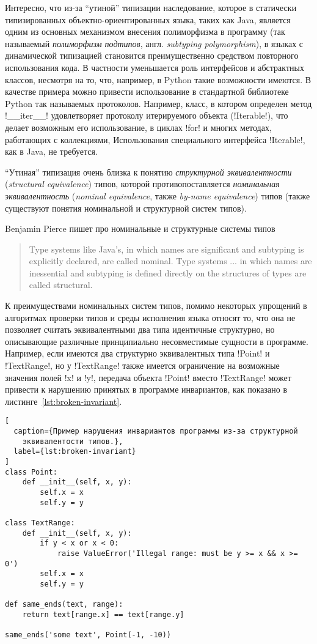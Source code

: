 Интересно, что из-за ``утиной'' типизации наследование, которое в статически
типизированных объектно-ориентированных языка, таких как Java, является
одним из основных механизмом внесения полиморфизма в программу (так называемый
\emph{полиморфизм подтипов}, англ. \emph{subtyping polymorphism}),
в языках с динамической типизацией становится преимущественно средством
повторного использования кода. В частности уменьшается роль интерфейсов и
абстрактных классов, несмотря на то, что, например, в Python такие возможности
имеются. В качестве примера можно привести использование в
стандартной библиотеке Python так называемых протоколов. Например, класс, в
котором определен метод !__iter__! удовлетворяет протоколу
итерируемого объекта (!Iterable!), что делает возможным его использование,
в циклах !for! и многих методах, работающих с коллекциями, 
Использования специального интерфейса !Iterable!, как в Java, не требуется.

``Утиная'' типизация очень близка к понятию \emph{структурной эквивалентности}
(\emph{structural equivalence}) типов, которой противопоставляется
\emph{номинальная эквивалентность} (\emph{nominal equivalence}, также
\emph{by-name equivalence}) типов (также существуют понятия номинальной и
структурной систем типов).

Benjamin Pierce пишет про номинальные и структурные системы
типов~\cite{Pierce2002}

\begin{quote}
Type systems like Java’s, in which names are significant and subtyping is
explicitly declared, are called nominal. Type systems ... in which names are
inessential and subtyping is defined directly on the structures of types are
called structural.
\end{quote}

К преимуществами номинальных систем типов, помимо некоторых упрощений в
алгоритмах проверки типов и среды исполнения языка относят то,
что она не позволяет считать эквивалентными два типа идентичные структурно, но
описывающие различные принципиально несовместимые сущности в программе.
Например, если имеются два структурно эквивалентных типа !Point! и
!TextRange!, но у !TextRange! также имеется ограничение на
возможные значения полей !x! и !y!, передача объекта !Point! вместо
!TextRange! может привести к нарушению принятых в программе инвариантов, как
показано в листинге~\ref{lst:broken-invariant}.

\begin{lstlisting}[
  caption={Пример нарушения инвариантов программы из-за структурной
    эквивалентости типов.},
  label={lst:broken-invariant}
]
class Point:
    def __init__(self, x, y):
        self.x = x
        self.y = y

class TextRange:
    def __init__(self, x, y):
        if y < x or x < 0:
            raise ValueError('Illegal range: must be y >= x && x >= 0')
        self.x = x
        self.y = y
        
def same_ends(text, range):
    return text[range.x] == text[range.y]

same_ends('some text', Point(-1, -10))
\end{lstlisting}

